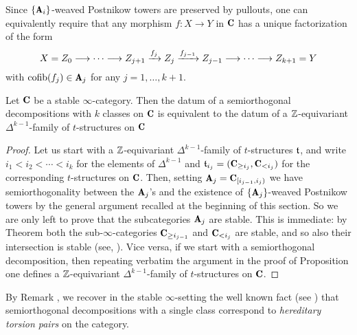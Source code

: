 \begin{remark}
Since $\{\cate{A}_i\}$-weaved Postnikow towers are preserved by pullouts, one can equivalently require that any morphism $f\colon X\to Y$ in $\C$ has a unique factorization of the form 
\[
X =Z_0\longrightarrow\cdots \longrightarrow Z_{j+1} \xrightarrow{f_{j}} Z_{j} \xrightarrow{f_{j-1}}Z_{j-1}\longrightarrow \cdots\longrightarrow Z_{k+1}=Y
\]
with $\cofib(f_j)\in \cate{A}_j$ for any $j=1,\dots, k+1$. 
\end{remark} 
\begin{theorem}\label{what.s.semiortho}
Let $\C$ be a stable $\infty$-category. Then the datum of a semiorthogonal decompositions with $k$ classes on $\C$ is equivalent to the datum of a $\mathbb{Z} $-equivariant $\Delta^{k-1}$-family of $t$-structures on $\C$
\end{theorem}
\begin{proof}
Let us start with a $\mathbb{Z} $-equivariant $\Delta^{k-1}$-family of $t$-structures $\mathfrak{t}$, and write $i_1<i_2<\cdots<i_k$ for the elements of $\Delta^{k-1}$ and $\tee_{i_j}=(\C_{\geq i_j},\C_{<i_j})$ for the corresponding $t$-structures on $\C$. Then, setting $\cate{A}_j=\C_{[i_{j-1}, i_j)}$ we have semiorthogonality between the $\cate{A}_j$'s and the existence of $\{\cate{A}_j\}$-weaved Postnikow towers by the general argument recalled at the beginning of this section. So we are only left to prove that the subcategories $\cate{A}_j$ are stable. This is immediate: by Theorem  both the sub-$\infty$-categories $\C_{\geq i_{j-1}}$ and $\C_{<i_j}$ are stable, and so also their intersection is stable (see, \cite{LurieHA}). Vice versa, if we start with a semiorthogonal decomposition, then repeating verbatim the argument in the proof of Proposition  one defines 
a $\mathbb{Z} $-equivariant $\Delta^{k-1}$-family of $t$-structures on $\C$.
\end{proof}
\begin{remark}By Remark , we recover in the stable $\infty$-setting the well known fact (see \cite[\textbf{IV.4}]{Beligiannisreiten}) that semiorthogonal decompositions with a single class correspond to \emph{hereditary torsion pairs} on the category.
\end{remark}
